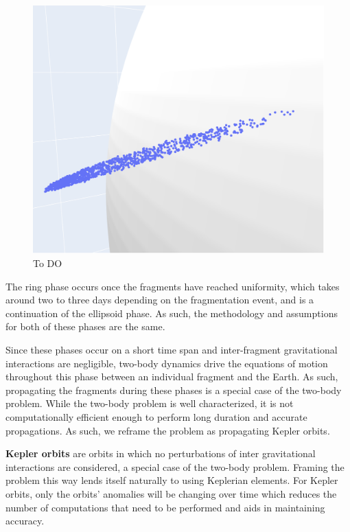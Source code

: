 \documentclass[a4paper, 12pt]{article}
\newcommand{\boldindex}[1]{%
	\textbf{#1}\index{#1}%
}
\begin{document}
\begin{figure}[h]
	\centering
	\includegraphics[scale=0.35]{ellisoid_phase}
	\caption{To DO }
	\label{fig:ellipsoid}
\end{figure}

The ring phase occurs once the fragments have reached uniformity, which takes around two to three days depending on the fragmentation event,  and is a continuation of the ellipsoid phase. As such, the methodology and assumptions for both of these phases are the same.

Since these phases occur on a short time span and inter-fragment gravitational interactions are negligible, two-body dynamics drive the equations of motion throughout this phase between an individual fragment and the Earth. As such, propagating the fragments during these phases is a special case of the two-body problem. While the two-body problem is well characterized, it is not computationally efficient enough to perform long duration and accurate propagations. As such, we reframe the problem as propagating Kepler orbits.

\boldindex{Kepler orbits} are orbits in which no perturbations of inter gravitational interactions are considered, a special case of the two-body problem. Framing the problem this way lends itself naturally to using Keplerian elements. For Kepler orbits, only the orbits' anomalies will be changing over time which reduces the number of computations that need to be performed and aids in maintaining accuracy.
\end{document}
